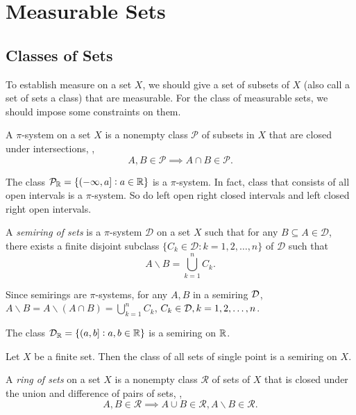 \chapter{Measurable Sets}
\section{Classes of Sets}
To establish measure on a set $X$, we should give a set of subsets of $X$ 
(also call a set of sets a class) that are measurable. 
For the class of measurable sets, we should impose some constraints on them. 

\begin{defn}
A $\pi$-system on a set $X$ is a nonempty class $\mathcal{P}$ of subsets in 
$X$ that are closed under intersections, \ie, 
\begin{equation*}
    A, B \in \mathcal{P} \implies A \cap B \in \mathcal{P}.
\end{equation*}
\end{defn}

\begin{example}
The class $\mathcal{P}_{\mathbb{R}} = \{(-\infty, a]: a \in \mathbb{R}\}$ is a $\pi$-system. 
In fact, class that consists of all open intervals is a $\pi$-system. 
So do left open right closed intervals and left closed right open intervals.
\end{example}

\begin{defn}
A \emph{semiring of sets} is a $\pi$-system $\mathcal{D}$ on a set $X$ 
such that for any $B \subseteq A \in \mathcal{D}$, there exists a finite 
disjoint subclass $\{C_k \in \mathcal{D}: k = 1, 2, \ldots, n\}$ of 
$\mathcal{D}$ such that 
\begin{equation*}
    A \backslash B = \bigcup_{k=1}^n C_k. 
\end{equation*}
\end{defn}

Since semirings are $\pi$-systems, for any $A, B$ in a semiring $\mathcal{D}$, 
$A \backslash B = A \backslash (A \cap B) = \bigcup_{k=1}^n C_k$, 
$C_k \in \mathcal{D}, k = 1, 2, \ldots, n$. 

\begin{example}
The class $\mathcal{D}_{\mathbb{R}} = \{(a, b]: a, b \in \mathbb{R}\}$ is a semiring on 
$\mathbb{R}$.
\end{example}

\begin{example}
Let $X$ be a finite set. Then the class of all sets of single point is a 
semiring on $X$. 
\end{example}
\begin{defn}
A \emph{ring of sets} on a set $X$ is a nonempty class $\mathcal{R}$ of sets 
of $X$ that is closed under the union and difference of pairs of sets, \ie, 
\begin{equation*}
    A, B \in \mathcal{R} \implies A \cup B \in \mathcal{R}, 
    A \backslash B \in \mathcal{R}. 
\end{equation*}
\end{defn}

